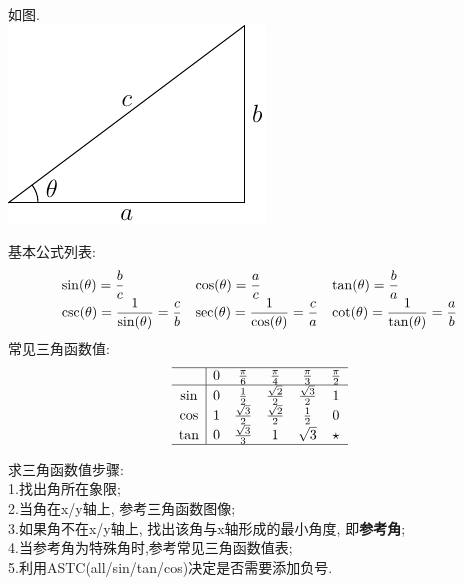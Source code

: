 \documentclass[UTTF8, fontset=ubuntu]{ctexart}
\begin{document}
如图.\\
\includegraphics{triangel.pdf}

基本公式列表:\\
\begin{displaymath}
\begin{array}{l l l}
    \displaystyle\sin(\theta)=\frac{b}{c} & \displaystyle\cos(\theta)=\frac{a}{c} & \displaystyle\tan(\theta)=\frac{b}{a}\\
    \displaystyle\csc(\theta)=\frac{1}{\sin(\theta)}=\frac{c}{b} & \displaystyle\sec(\theta)=\frac{1}{\cos(\theta)}=\frac{c}{a} & \displaystyle\cot(\theta)=\frac{1}{\tan(\theta)}=\frac{a}{b}
\end{array}
\end{displaymath}
常见三角函数值:
\begin{displaymath}
\begin{array}{c|c c c c c}
\hline
    & 0 & \frac{\pi}{6} & \frac{\pi}{4} & \frac{\pi}{3} & \frac{\pi}{2}\\
\hline
    \sin & 0 & \frac{1}{2} & \frac{\sqrt{2}}{2} & \frac{\sqrt{3}}{2} & 1\\
    \cos & 1 & \frac{\sqrt{3}}{2} & \frac{\sqrt{2}}{2} & \frac{1}{2} & 0\\
    \tan & 0 & \frac{\sqrt{3}}{3} & 1 & \sqrt{3} & \star\\
\hline
\end{array}
\end{displaymath}

求三角函数值步骤:\\
1.找出角所在象限;\\
2.当角在x/y轴上, 参考三角函数图像;\\
3.如果角不在x/y轴上, 找出该角与x轴形成的最小角度, 即\textbf{参考角};\\
4.当参考角为特殊角时,参考常见三角函数值表;\\
5.利用ASTC(all/sin/tan/cos)决定是否需要添加负号.
\end{document}
